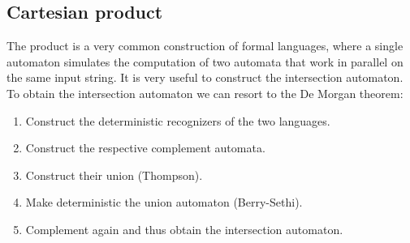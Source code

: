 \subsection*{Cartesian product}
The product is a very common construction of formal languages, where a single automaton simulates the computation of two automata that work in parallel on the same input string. 
It is very useful to construct the intersection automaton. 
To obtain the intersection automaton we can resort to the De Morgan theorem: 
\begin{enumerate}
    \item Construct the deterministic recognizers of the two languages.
    \item Construct the respective complement automata. 
    \item Construct their union (Thompson). 
    \item Make deterministic the union automaton (Berry-Sethi). 
    \item Complement again and thus obtain the intersection automaton. 
\end{enumerate}

